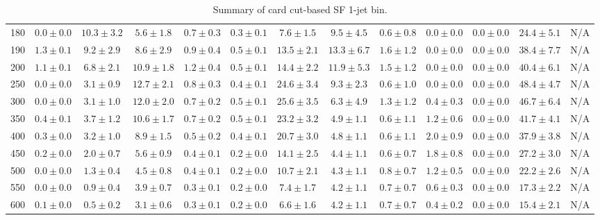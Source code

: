 \begin{table}
{\begin{center}
\begin{tabular}{l | c c | c c c c c c c c  | c c}
180 & $0.0\pm0.0$ & $10.3\pm3.2$ & $5.6\pm1.8$ & $0.7\pm0.3$ & $0.3\pm0.1$ & $7.6\pm1.5$ & $9.5\pm4.5$ & $0.6\pm0.8$ & $0.0\pm0.0$ & $0.0\pm0.0$ & $24.4\pm5.1$ & N/A \\
190 & $1.3\pm0.1$ & $9.2\pm2.9$ & $8.6\pm2.9$ & $0.9\pm0.4$ & $0.5\pm0.1$ & $13.5\pm2.1$ & $13.3\pm6.7$ & $1.6\pm1.2$ & $0.0\pm0.0$ & $0.0\pm0.0$ & $38.4\pm7.7$ & N/A \\
200 & $1.1\pm0.1$ & $6.8\pm2.1$ & $10.9\pm1.8$ & $1.2\pm0.4$ & $0.5\pm0.1$ & $14.4\pm2.2$ & $11.9\pm5.3$ & $1.5\pm1.2$ & $0.0\pm0.0$ & $0.0\pm0.0$ & $40.4\pm6.1$ & N/A \\
250 & $0.0\pm0.0$ & $3.1\pm0.9$ & $12.7\pm2.1$ & $0.8\pm0.3$ & $0.4\pm0.1$ & $24.6\pm3.4$ & $9.3\pm2.3$ & $0.6\pm1.0$ & $0.0\pm0.0$ & $0.0\pm0.0$ & $48.4\pm4.7$ & N/A \\
300 & $0.0\pm0.0$ & $3.1\pm1.0$ & $12.0\pm2.0$ & $0.7\pm0.2$ & $0.5\pm0.1$ & $25.6\pm3.5$ & $6.3\pm4.9$ & $1.3\pm1.2$ & $0.4\pm0.3$ & $0.0\pm0.0$ & $46.7\pm6.4$ & N/A \\
350 & $0.4\pm0.1$ & $3.7\pm1.2$ & $10.6\pm1.7$ & $0.7\pm0.2$ & $0.5\pm0.1$ & $23.2\pm3.2$ & $4.9\pm1.1$ & $0.6\pm1.1$ & $1.2\pm0.6$ & $0.0\pm0.0$ & $41.7\pm4.1$ & N/A \\
400 & $0.3\pm0.0$ & $3.2\pm1.0$ & $8.9\pm1.5$ & $0.5\pm0.2$ & $0.4\pm0.1$ & $20.7\pm3.0$ & $4.8\pm1.1$ & $0.6\pm1.1$ & $2.0\pm0.9$ & $0.0\pm0.0$ & $37.9\pm3.8$ & N/A \\
450 & $0.2\pm0.0$ & $2.0\pm0.7$ & $5.6\pm0.9$ & $0.4\pm0.1$ & $0.2\pm0.0$ & $14.1\pm2.5$ & $4.4\pm1.1$ & $0.6\pm0.7$ & $1.8\pm0.8$ & $0.0\pm0.0$ & $27.2\pm3.0$ & N/A \\
500 & $0.0\pm0.0$ & $1.3\pm0.4$ & $4.5\pm0.8$ & $0.4\pm0.1$ & $0.2\pm0.0$ & $10.7\pm2.1$ & $4.3\pm1.1$ & $0.8\pm0.7$ & $1.2\pm0.5$ & $0.0\pm0.0$ & $22.2\pm2.6$ & N/A \\
550 & $0.0\pm0.0$ & $0.9\pm0.4$ & $3.9\pm0.7$ & $0.3\pm0.1$ & $0.2\pm0.0$ & $7.4\pm1.7$ & $4.2\pm1.1$ & $0.7\pm0.7$ & $0.6\pm0.3$ & $0.0\pm0.0$ & $17.3\pm2.2$ & N/A \\
600 & $0.1\pm0.0$ & $0.5\pm0.2$ & $3.1\pm0.6$ & $0.3\pm0.1$ & $0.2\pm0.0$ & $6.6\pm1.6$ & $4.2\pm1.1$ & $0.7\pm0.7$ & $0.4\pm0.2$ & $0.0\pm0.0$ & $15.4\pm2.1$ & N/A \\
\hline
\end{tabular}
\end{center}
}
\caption{Summary of card cut-based SF 1-jet bin.}
\end{table}
